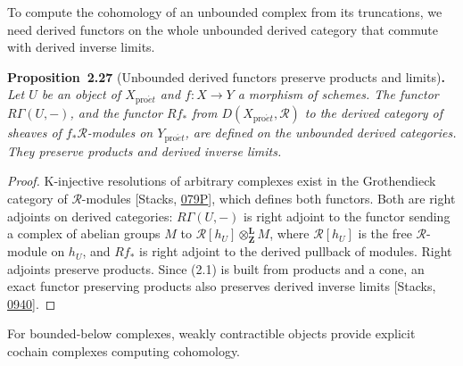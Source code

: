 \documentclass[11pt]{article}
\newenvironment{bpstatement}[2]{\par\addvspace{0.6\baselineskip}\noindent\textbf{#1}#2\textbf{.}\enspace\ignorespaces}
  {\par\addvspace{0.4\baselineskip}}
\newenvironment{bpstatementit}[2]{\begin{bpstatement}{#1}{#2}\itshape\ignorespaces}{\end{bpstatement}}
\begin{document}
\label{bp77}%
To compute the cohomology of an unbounded complex from its truncations, we need derived functors on the whole unbounded derived category that commute with derived inverse limits.

\label{bp78}%
\begin{bpstatementit}{Proposition~2.27}{ (Unbounded derived functors preserve products and limits)}
Let \(U\) be an object of \(X_{\mathrm{pro}\acute{e}t}\) and \(f:X\to Y\) a morphism of schemes. The functor \(R\Gamma(U,-)\), and the functor \(Rf_*\) from \(D(X_{\mathrm{pro}\acute{e}t},\mathcal R)\) to the derived category of sheaves of \(f_*\mathcal R\)-modules on \(Y_{\mathrm{pro}\acute{e}t}\), are defined on the unbounded derived categories. They preserve products and derived inverse limits.
\end{bpstatementit}

\begin{proof}[{Proof}]\label{bp79}%
K-injective resolutions of arbitrary complexes exist in the Grothendieck category of \(\mathcal R\)-modules [Stacks, \href{https://stacks.math.columbia.edu/tag/079P}{079P}], which defines both functors. Both are right adjoints on derived categories: \(R\Gamma(U,-)\) is right adjoint to the functor sending a complex of abelian groups \(M\) to \(\mathcal R[h_U]\otimes^{\mathbf L}_{\mathbf Z}M\), where \(\mathcal R[h_U]\) is the free \(\mathcal R\)-module on \(h_U\), and \(Rf_*\) is right adjoint to the derived pullback of modules. Right adjoints preserve products. Since (2.1) is built from products and a cone, an exact functor preserving products also preserves derived inverse limits [Stacks, \href{https://stacks.math.columbia.edu/tag/0940}{0940}].
\end{proof}

\label{bp80}%
For bounded-below complexes, weakly contractible objects provide explicit cochain complexes computing cohomology.
\end{document}
